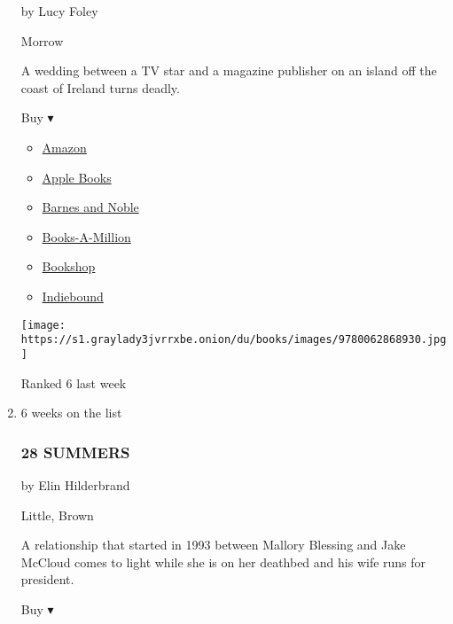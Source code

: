 \begin{enumerate}
  by Lucy Foley

  Morrow

  A wedding between a TV star and a magazine publisher on an island off
  the coast of Ireland turns deadly.

  Buy ▾

  \begin{itemize}
  \tightlist
  \item
    \href{https://www.amazon.com/dp/0062868934?tag=NYTBSREV-20\&tag=NYTBS-20}{Amazon}
  \item
    \href{https://du-gae-books-dot-nyt-du-prd.appspot.com/buy?title=THE+GUEST+LIST\&author=Lucy+Foley}{Apple
    Books}
  \item
    \href{https://www.anrdoezrs.net/click-7990613-11819508?url=https\%3A\%2F\%2Fwww.barnesandnoble.com\%2Fw\%2F\%3Fean\%3D9780062868954}{Barnes
    and Noble}
  \item
    \href{https://www.anrdoezrs.net/click-7990613-35140?url=https\%3A\%2F\%2Fwww.booksamillion.com\%2Fp\%2FTHE\%2BGUEST\%2BLIST\%2FLucy\%2BFoley\%2F9780062868954}{Books-A-Million}
  \item
    \href{https://bookshop.org/a/3546/9780062868954}{Bookshop}
  \item
    \href{https://www.indiebound.org/book/9780062868954?aff=NYT}{Indiebound}
  \end{itemize}

  \texttt{[image: https://s1.graylady3jvrrxbe.onion/du/books/images/9780062868930.jpg]}

  Ranked 6 last week
\item
  6 weeks on the list

  \hypertarget{28-summers}{%
  \subsubsection{28 SUMMERS}\label{28-summers}}

  by Elin Hilderbrand

  Little, Brown

  A relationship that started in 1993 between Mallory Blessing and Jake
  McCloud comes to light while she is on her deathbed and his wife runs
  for president.

  Buy ▾


\end{enumerate}
